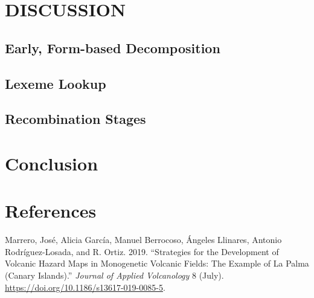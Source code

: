 \documentclass[
]{article}
\newlength{\cslhangindent}
\newenvironment{CSLReferences}[2] %
 {\begin{list}{}{%
  \setlength{\itemindent}{0pt}
  \setlength{\leftmargin}{0pt}
  \setlength{\parsep}{0pt}
  \ifodd #1
   \setlength{\leftmargin}{\cslhangindent}
   \setlength{\itemindent}{-1\cslhangindent}
  \fi
  \setlength{\itemsep}{#2\baselineskip}}}
 {\end{list}}
\begin{document}
\section{DISCUSSION}\label{discussion}

\subsection{Early, Form-based
Decomposition}\label{early-form-based-decomposition}

\subsection{Lexeme Lookup}\label{lexeme-lookup}

\subsection{Recombination Stages}\label{recombination-stages}

\section{Conclusion}\label{conclusion}

\section*{References}\label{references}

\label{refs}
\begin{CSLReferences}{1}{0}
Marrero, José, Alicia García, Manuel Berrocoso, Ángeles Llinares,
Antonio Rodríguez-Losada, and R. Ortiz. 2019. {``Strategies for the
Development of Volcanic Hazard Maps in Monogenetic Volcanic Fields: The
Example of {La} {Palma} ({Canary} {Islands}).''} \emph{Journal of
Applied Volcanology} 8 (July).
\url{https://doi.org/10.1186/s13617-019-0085-5}.

\end{CSLReferences}
\end{document}
